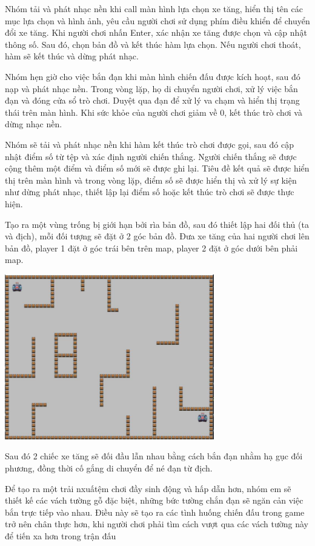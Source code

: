 \documentclass[a4paper]{article}
\begin{document}
Nhóm tải và phát nhạc nền khi call màn hình lựa chọn xe tăng, hiển thị
tên các mục lựa chọn và hình ảnh, yêu cầu người chơi sử dụng phím điều
khiển để chuyển đổi xe tăng. Khi người chơi nhấn Enter, xác nhận xe tăng
được chọn và cập nhật thông số. Sau đó, chọn bản đồ và kết thúc hàm lựa
chọn. Nếu người chơi thoát, hàm sẽ kết thúc và dừng phát nhạc.

Nhóm hẹn giờ cho việc bắn đạn khi màn hình chiến đấu được kích hoạt, sau
đó nạp và phát nhạc nền. Trong vòng lặp, họ di chuyển người chơi, xử lý
việc bắn đạn và đóng cửa sổ trò chơi. Duyệt qua đạn để xử lý va chạm và
hiển thị trạng thái trên màn hình. Khi sức khỏe của người chơi giảm về
0, kết thúc trò chơi và dừng nhạc nền.

Nhóm sẽ tải và phát nhạc nền khi hàm kết thúc trò chơi được gọi, sau đó
cập nhật điểm số từ tệp và xác định người chiến thắng. Người chiến thắng
sẽ được cộng thêm một điểm và điểm số mới sẽ được ghi lại. Tiêu đề kết
quả sẽ được hiển thị trên màn hình và trong vòng lặp, điểm số sẽ được
hiển thị và xử lý sự kiện như dừng phát nhạc, thiết lập lại điểm số hoặc
kết thúc trò chơi sẽ được thực hiện.

Tạo ra một vùng trống bị giới hạn bởi rìa bản đồ, sau đó thiết lập hai
đối thủ (ta và địch), mỗi đối tượng sẽ đặt ở 2 góc bản đồ. Đưa xe tăng
của hai người chơi lên bản đồ, player 1 đặt ở góc trái bên trên map,
player 2 đặt ở góc dưới bên phải map.

\includegraphics[width=3.58889in,height=2.83333in]{image25.png}

Sau đó 2 chiếc xe tăng sẽ đối đầu lẫn nhau bằng cách bắn đạn nhằm hạ gục
đối phương, đồng thời cố gắng di chuyển để né đạn từ địch.

Để tạo ra một trải nxuấtệm chơi đầy sinh động và hấp dẫn hơn, nhóm em sẽ
thiết kế các vách tường gỗ đặc biệt, những bức tường chắn đạn sẽ ngăn
cản việc bắn trực tiếp vào nhau. Điều này sẽ tạo ra các tình huống chiến
đấu trong game trở nên chân thực hơn, khi người chơi phải tìm cách vượt
qua các vách tường này để tiến xa hơn trong trận đấu
\end{document}
